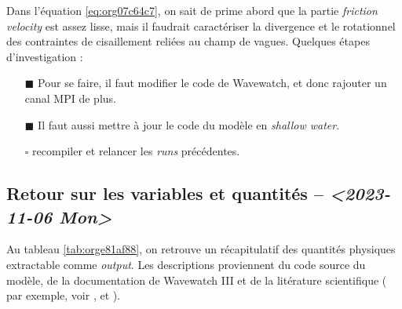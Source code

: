 \documentclass[10pt]{article}
\numberwithin{equation}{section}
\renewcommand{\boxtimes}{\blacksquare}
\begin{document}
Dans l'équation \ref{eq:org07c64c7}, on sait de prime abord que la partie \emph{friction velocity} est assez lisse, mais il faudrait caractériser la divergence et le rotationnel des contraintes de cisaillement reliées au champ de vagues.
Quelques étapes d'investigation : 
\begin{itemize}
\item[{$\boxtimes$}] Pour se faire, il faut modifier le code de Wavewatch, et donc rajouter un canal MPI de plus.
\item[{$\boxtimes$}] Il faut aussi mettre à jour le code du modèle en \emph{shallow water}.
\item[{$\square$}] recompiler et relancer les \emph{runs} précédentes.
\end{itemize}
\subsection{Retour sur les variables et quantités -- \textit{<2023-11-06 Mon>}}
\label{sec:org43ca883}

Au tableau \ref{tab:orge81af88}, on retrouve un récapitulatif des quantités physiques extractable comme \emph{output}.
Les descriptions proviennent du code source du modèle, de la documentation de Wavewatch III et de la litérature scientifique ( par exemple, voir \Textcite{ardhuin2010semiempirical}, \autocite{couvelard2020development} et \textcite{wu_breivik_2019}).
\end{document}
